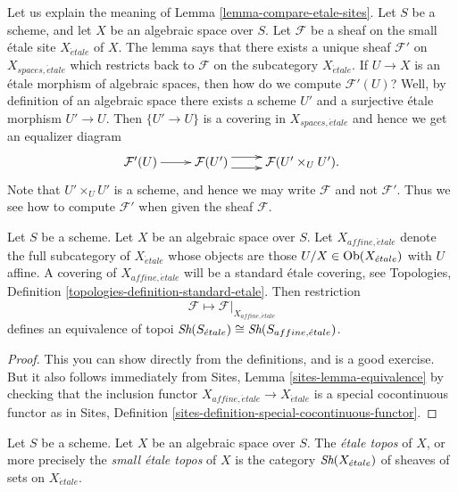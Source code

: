 \begin{remark}
\label{remark-explain-equivalence}
Let us explain the meaning of Lemma \ref{lemma-compare-etale-sites}.
Let $S$ be a scheme, and let $X$ be an algebraic space over $S$.
Let $\mathcal{F}$ be a sheaf on the small \'etale site $X_{\acute{e}tale}$ of
$X$. The lemma says that there exists a unique sheaf $\mathcal{F}'$ on
$X_{spaces, \acute{e}tale}$ which restricts back to $\mathcal{F}$ on the
subcategory $X_{\acute{e}tale}$. If $U \to X$ is an \'etale morphism of
algebraic spaces, then how do we compute $\mathcal{F}'(U)$? Well, by definition
of an algebraic space there exists a scheme $U'$ and a surjective
\'etale morphism $U' \to U$. Then $\{U' \to U\}$ is a covering in
$X_{spaces, \acute{e}tale}$ and hence we get an equalizer diagram
$$
\xymatrix{
\mathcal{F}'(U) \ar[r] &
\mathcal{F}(U') \ar@<1ex>[r] \ar@<-1ex>[r] &
\mathcal{F}(U' \times_U U').
}
$$
Note that $U' \times_U U'$ is a scheme, and hence we may
write $\mathcal{F}$ and not $\mathcal{F}'$.
Thus we see how to compute $\mathcal{F}'$
when given the sheaf $\mathcal{F}$.
\end{remark}

\begin{lemma}
\label{lemma-alternative}
Let $S$ be a scheme.
Let $X$ be an algebraic space over $S$.
Let $X_{affine, \acute{e}tale}$ denote the full subcategory of
$X_{\acute{e}tale}$ whose objects are those
$U/X \in \mathop{\rm Ob}\nolimits(X_{\acute{e}tale})$ with $U$ affine.
A covering of $X_{affine, \acute{e}tale}$ will be a
standard \'etale covering, see
Topologies, Definition \ref{topologies-definition-standard-etale}.
Then restriction
$$
\mathcal{F} \longmapsto \mathcal{F}|_{X_{affine, \acute{e}tale}}
$$
defines an equivalence of topoi
$\mathop{\textit{Sh}}\nolimits(S_{\acute{e}tale}) \cong \mathop{\textit{Sh}}\nolimits(S_{affine, \acute{e}tale})$.
\end{lemma}

\begin{proof}
This you can show directly from the definitions, and is a good exercise.
But it also follows immediately from
Sites, Lemma \ref{sites-lemma-equivalence}
by checking that the inclusion functor
$X_{affine, \acute{e}tale} \to X_{\acute{e}tale}$ is a special cocontinuous
functor as in
Sites, Definition \ref{sites-definition-special-cocontinuous-functor}.
\end{proof}

\begin{definition}
\label{definition-etale-topos}
Let $S$ be a scheme. Let $X$ be an algebraic space over $S$.
The {\it \'etale topos} of $X$, or more precisely the
{\it small \'etale topos} of $X$ is the category
$\mathop{\textit{Sh}}\nolimits(X_{\acute{e}tale})$
of sheaves of sets on $X_{\acute{e}tale}$.
\end{definition}

